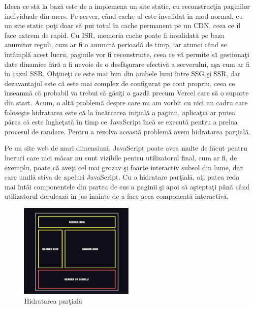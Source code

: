 \documentclass[12pt, a4paper]{report}
\begin{document}
Ideea ce st\u a la baz\u a este de a implemena un site static, cu reconstruc\c tia paginilor individuale din mers. Pe server, c\^ and cache-ul este invalidat \^ in mod normal, cu un site static po\c ti doar s\u a pui totul \^ in cache permanent pe un CDN, ceea ce \^ il face extrem de rapid. Cu ISR, memoria cache poate fi invalidat\u a pe baza anumitor reguli, cum ar fi o anumit\u a perioad\u a de timp, iar atunci c\^ and se \^ int\^ ampl\u a acest lucru, paginile vor fi reconstruite, ceea ce v\u a permite s\u a gestiona\c ti date dinamice f\u ar\u a a fi nevoie de o desf\u a\c surare efectiv\u a a serverului, a\c sa cum ar fi \^ in cazul SSR. Ob\c tine\c ti ce este mai bun din ambele lumi \^ intre SSG \c si SSR, dar dezavantajul este c\u a este mai complex de configurat pe cont propriu, ceea ce \^ inseamn\u a c\u a probabil va trebui s\u a g\u asi\c ti o gazd\u a precum Vercel care s\u a o suporte din start. Acum, o alt\u a problem\u a despre care nu am vorbit cu nici un cadru care folose\c ste hidratarea este c\u a la \^ inc\u arcarea ini\c tial\u a a paginii, aplica\c tia ar putea p\u area c\u a este \^ inghe\c tat\u a \^ in timp ce JavaScript \^ inc\u a se execut\u a pentru a prelua procesul de randare. Pentru a rezolva aceast\u a problem\u a avem hidratarea par\c tial\u a. \cite{fireship}

Pe un site web de mari dimensiuni, JavaScript poate avea multe de f\u acut pentru lucruri care nici m\u acar nu sunt vizibile pentru utilizatorul final, cum ar fi, de exemplu, poate c\u a ave\c ti cel mai grozav \c si foarte interactiv subsol din lume, dar care umfl\u a stiva de apeluri JavaScript. Cu o hidratare par\c tial\u a, a\c ti putea reda mai \^ int\^ ai componentele din partea de sus a paginii \c si apoi s\u a a\c stepta\c ti p\^ an\u a c\^ and utilizatorul deruleaz\u a \^ in jos \^ inainte de a face acea component\u a interactiv\u a.

\begin{figure}[htbp]
	\centering
	\includegraphics[width=0.5\textwidth]{42.png}
	\caption{Hidratarea par\c tial\u a}
	\label{fig:partial hydration}
\end{figure}
\end{document}
